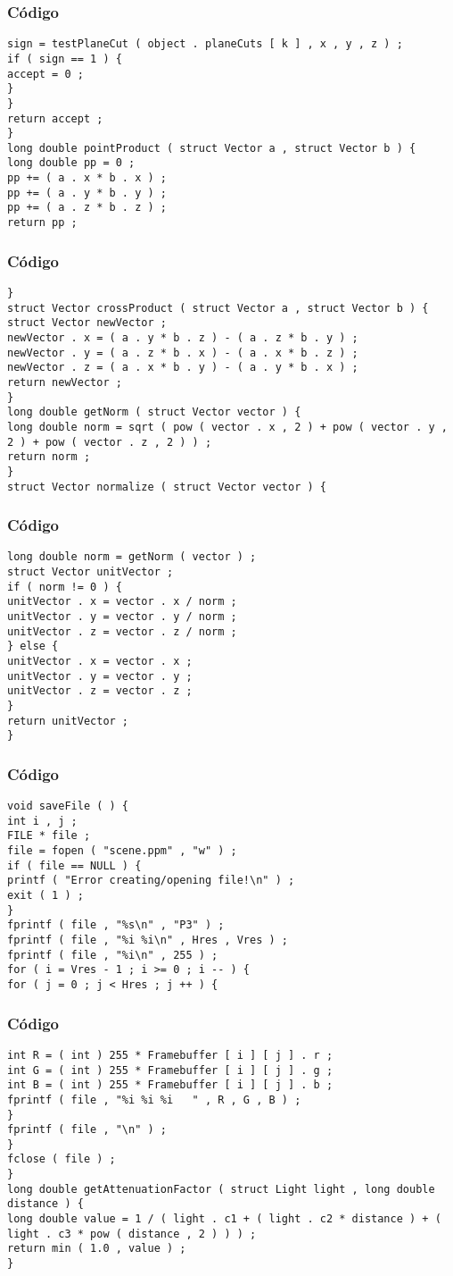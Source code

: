 \documentclass{beamer}
\begin{document}
\begin{frame}[fragile]
\frametitle{C\'odigo}
\begin{verbatim}
sign = testPlaneCut ( object . planeCuts [ k ] , x , y , z ) ; 
if ( sign == 1 ) { 
accept = 0 ; 
} 
} 
return accept ; 
} 
long double pointProduct ( struct Vector a , struct Vector b ) { 
long double pp = 0 ; 
pp += ( a . x * b . x ) ; 
pp += ( a . y * b . y ) ; 
pp += ( a . z * b . z ) ; 
return pp ; 
\end{verbatim}
\end{frame}
\begin{frame}[fragile]
\frametitle{C\'odigo}
\begin{verbatim}
} 
struct Vector crossProduct ( struct Vector a , struct Vector b ) { 
struct Vector newVector ; 
newVector . x = ( a . y * b . z ) - ( a . z * b . y ) ; 
newVector . y = ( a . z * b . x ) - ( a . x * b . z ) ; 
newVector . z = ( a . x * b . y ) - ( a . y * b . x ) ; 
return newVector ; 
} 
long double getNorm ( struct Vector vector ) { 
long double norm = sqrt ( pow ( vector . x , 2 ) + pow ( vector . y , 2 ) + pow ( vector . z , 2 ) ) ; 
return norm ; 
} 
struct Vector normalize ( struct Vector vector ) { 
\end{verbatim}
\end{frame}
\begin{frame}[fragile]
\frametitle{C\'odigo}
\begin{verbatim}
long double norm = getNorm ( vector ) ; 
struct Vector unitVector ; 
if ( norm != 0 ) { 
unitVector . x = vector . x / norm ; 
unitVector . y = vector . y / norm ; 
unitVector . z = vector . z / norm ; 
} else { 
unitVector . x = vector . x ; 
unitVector . y = vector . y ; 
unitVector . z = vector . z ; 
} 
return unitVector ; 
} 
\end{verbatim}
\end{frame}
\begin{frame}[fragile]
\frametitle{C\'odigo}
\begin{verbatim}
void saveFile ( ) { 
int i , j ; 
FILE * file ; 
file = fopen ( "scene.ppm" , "w" ) ; 
if ( file == NULL ) { 
printf ( "Error creating/opening file!\n" ) ; 
exit ( 1 ) ; 
} 
fprintf ( file , "%s\n" , "P3" ) ; 
fprintf ( file , "%i %i\n" , Hres , Vres ) ; 
fprintf ( file , "%i\n" , 255 ) ; 
for ( i = Vres - 1 ; i >= 0 ; i -- ) { 
for ( j = 0 ; j < Hres ; j ++ ) { 
\end{verbatim}
\end{frame}
\begin{frame}[fragile]
\frametitle{C\'odigo}
\begin{verbatim}
int R = ( int ) 255 * Framebuffer [ i ] [ j ] . r ; 
int G = ( int ) 255 * Framebuffer [ i ] [ j ] . g ; 
int B = ( int ) 255 * Framebuffer [ i ] [ j ] . b ; 
fprintf ( file , "%i %i %i   " , R , G , B ) ; 
} 
fprintf ( file , "\n" ) ; 
} 
fclose ( file ) ; 
} 
long double getAttenuationFactor ( struct Light light , long double distance ) { 
long double value = 1 / ( light . c1 + ( light . c2 * distance ) + ( light . c3 * pow ( distance , 2 ) ) ) ; 
return min ( 1.0 , value ) ; 
} 
\end{verbatim}
\end{frame}
\end{document}
